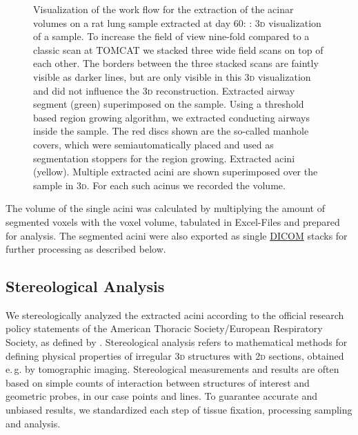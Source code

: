 \documentclass[%
	paper=a4,%
	abstract=true,%
	]{scrartcl}
\newlength\imagescale		%
\newcommand{\eg}{e.\,g.\xspace}
\newcommand{\twod}{2\textsc{d}\xspace}
\newcommand{\threed}{3\textsc{d}\xspace}
\begin{document}
\begin{figure}
{%
		\label{subfig:extracted acini}%
		}
	\caption{Visualization of the work flow for the extraction of the acinar volumes on a rat lung sample extracted at day 60: %
		: \threed visualization of a sample. To increase the field of view nine-fold compared to a classic scan at TOMCAT we stacked three wide field scans on top of each other. The borders between the three stacked scans are faintly visible as darker lines, but are only visible in this \threed visualization and did not influence the \threed reconstruction. %
		 Extracted airway segment (green) superimposed on the sample. Using a threshold based region growing algorithm, we extracted conducting airways inside the sample. The red discs shown are the so-called manhole covers, which were semiautomatically placed and used as segmentation stoppers for the region growing. %
		 Extracted acini (yellow). Multiple extracted acini are shown superimposed over the sample in \threed. For each such acinus we recorded the volume.%
		}
	\label{fig:workflow}
\end{figure}

The volume of the single acini was calculated by multiplying the amount of segmented voxels with the voxel volume, tabulated in Excel-Files and prepared for analysis. The segmented acini were also exported as single \href{https://secure.wikimedia.org/wikipedia/en/w/index.php?title=Digital_Imaging_and_Communications_in_Medicine&oldid=415023605}{DICOM} stacks for further processing as described below.

\subsection{Stereological Analysis}
We stereologically analyzed the extracted acini according to the official research policy statements of the American Thoracic Society/European Respiratory Society, as defined by \citet{Hsia2010}. Stereological analysis refers to mathematical methods for defining physical properties of irregular \threed structures with \twod sections, obtained \eg by tomographic imaging. Stereological measurements and results are often based on simple counts of interaction between structures of interest and geometric probes, in our case points and lines. To guarantee accurate and unbiased results, we standardized each step of tissue fixation, processing sampling and analysis.
\end{document}
